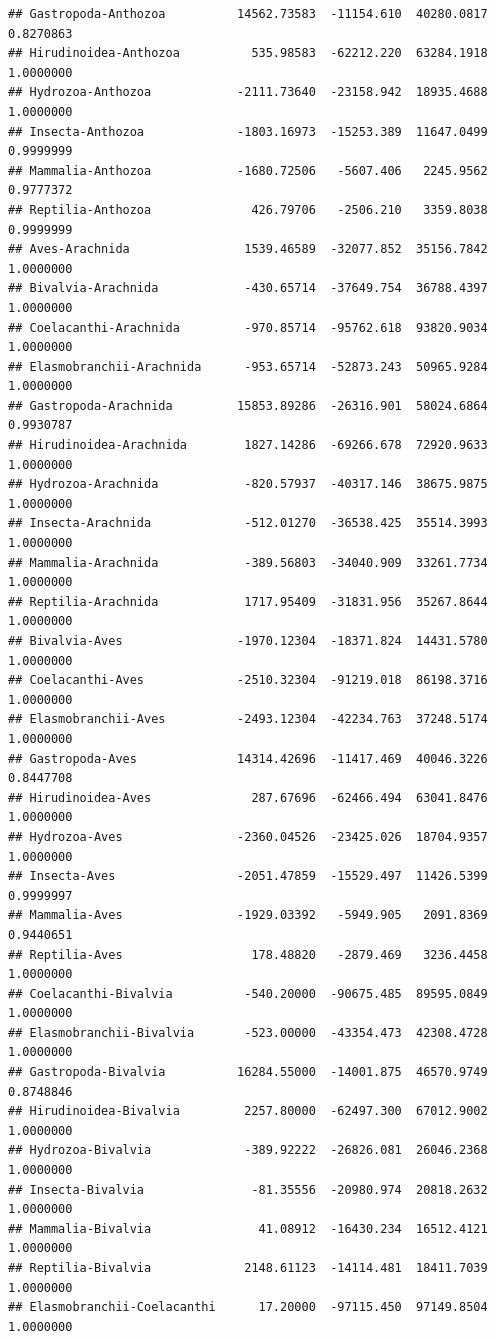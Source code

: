 \documentclass[
  12pt,
]{article}
\begin{document}
\begin{verbatim}
## Gastropoda-Anthozoa          14562.73583  -11154.610  40280.0817 0.8270863
## Hirudinoidea-Anthozoa          535.98583  -62212.220  63284.1918 1.0000000
## Hydrozoa-Anthozoa            -2111.73640  -23158.942  18935.4688 1.0000000
## Insecta-Anthozoa             -1803.16973  -15253.389  11647.0499 0.9999999
## Mammalia-Anthozoa            -1680.72506   -5607.406   2245.9562 0.9777372
## Reptilia-Anthozoa              426.79706   -2506.210   3359.8038 0.9999999
## Aves-Arachnida                1539.46589  -32077.852  35156.7842 1.0000000
## Bivalvia-Arachnida            -430.65714  -37649.754  36788.4397 1.0000000
## Coelacanthi-Arachnida         -970.85714  -95762.618  93820.9034 1.0000000
## Elasmobranchii-Arachnida      -953.65714  -52873.243  50965.9284 1.0000000
## Gastropoda-Arachnida         15853.89286  -26316.901  58024.6864 0.9930787
## Hirudinoidea-Arachnida        1827.14286  -69266.678  72920.9633 1.0000000
## Hydrozoa-Arachnida            -820.57937  -40317.146  38675.9875 1.0000000
## Insecta-Arachnida             -512.01270  -36538.425  35514.3993 1.0000000
## Mammalia-Arachnida            -389.56803  -34040.909  33261.7734 1.0000000
## Reptilia-Arachnida            1717.95409  -31831.956  35267.8644 1.0000000
## Bivalvia-Aves                -1970.12304  -18371.824  14431.5780 1.0000000
## Coelacanthi-Aves             -2510.32304  -91219.018  86198.3716 1.0000000
## Elasmobranchii-Aves          -2493.12304  -42234.763  37248.5174 1.0000000
## Gastropoda-Aves              14314.42696  -11417.469  40046.3226 0.8447708
## Hirudinoidea-Aves              287.67696  -62466.494  63041.8476 1.0000000
## Hydrozoa-Aves                -2360.04526  -23425.026  18704.9357 1.0000000
## Insecta-Aves                 -2051.47859  -15529.497  11426.5399 0.9999997
## Mammalia-Aves                -1929.03392   -5949.905   2091.8369 0.9440651
## Reptilia-Aves                  178.48820   -2879.469   3236.4458 1.0000000
## Coelacanthi-Bivalvia          -540.20000  -90675.485  89595.0849 1.0000000
## Elasmobranchii-Bivalvia       -523.00000  -43354.473  42308.4728 1.0000000
## Gastropoda-Bivalvia          16284.55000  -14001.875  46570.9749 0.8748846
## Hirudinoidea-Bivalvia         2257.80000  -62497.300  67012.9002 1.0000000
## Hydrozoa-Bivalvia             -389.92222  -26826.081  26046.2368 1.0000000
## Insecta-Bivalvia               -81.35556  -20980.974  20818.2632 1.0000000
## Mammalia-Bivalvia               41.08912  -16430.234  16512.4121 1.0000000
## Reptilia-Bivalvia             2148.61123  -14114.481  18411.7039 1.0000000
## Elasmobranchii-Coelacanthi      17.20000  -97115.450  97149.8504 1.0000000

\end{verbatim}
\end{document}
